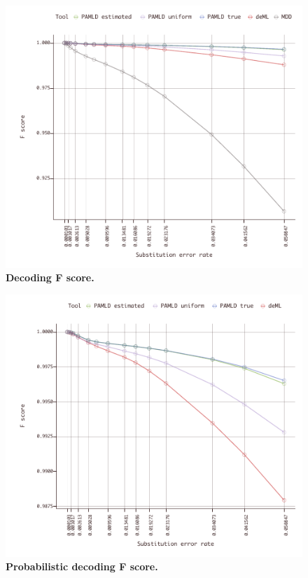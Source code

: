 \documentclass[10pt,twocolumn]{article}
\begin{document}
\begin{figure}[htbp]
\centering
\includegraphics[keepaspectratio,scale=1]{../plot/1_overall_0550_mdd}
\caption{ \footnotesize{ \textbf{Decoding F score.} } }
\label{fig:01}
\end{figure}

\begin{figure}[htbp]
\centering
\includegraphics[keepaspectratio,scale=1]{../plot/2_overall_0550}
\caption{\footnotesize{\textbf{Probabilistic decoding F score.} } }
\label{fig:02}
\end{figure}
\end{document}
